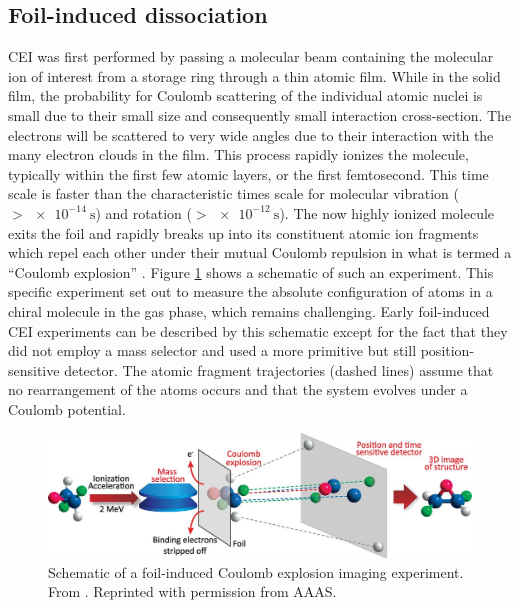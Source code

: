 \subsection{Foil-induced dissociation}
CEI was first performed by passing a molecular beam containing the molecular ion of interest from a storage ring through a thin atomic film. While in the solid film, the probability for Coulomb scattering of the individual atomic nuclei is small due to their small size and consequently small interaction cross-section. The electrons will be scattered to very wide angles due to their interaction with the many electron clouds in the film. This process rapidly ionizes the molecule, typically within the first few atomic layers, or the first femtosecond. This time scale is faster than the characteristic times scale for molecular vibration ($>\SI{e-14}{\s}$) and rotation ($>\SI{e-12}{\s}$). The now highly ionized molecule exits the foil and rapidly breaks up into its constituent atomic ion fragments which repel each other under their mutual Coulomb repulsion in what is termed a ``Coulomb explosion'' \citep{Vager89}. Figure \ref{fig:foilExperiment} shows a schematic of such an experiment. This specific experiment set out to measure the absolute configuration of atoms in a chiral molecule in the gas phase, which remains challenging. Early foil-induced CEI experiments can be described by this schematic except for the fact that they did not employ a mass selector and used a more primitive but still position-sensitive detector.  The atomic fragment trajectories (dashed lines) assume that no rearrangement of the atoms occurs and that the system evolves under a Coulomb potential.

\begin{figure}
  \centering
  \includegraphics[width=\textwidth]{gfx/FoilExperiment}
  \caption[Schematic of a foil-induced Coulomb explosion imaging experiment.]
  {Schematic of a foil-induced Coulomb explosion imaging experiment. From \citet{Herwig13}. Reprinted with permission from AAAS.}
  \label{fig:foilExperiment}
\end{figure}


